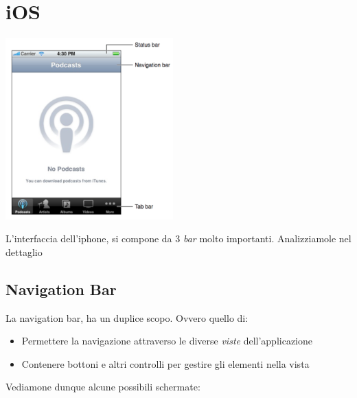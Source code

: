 \documentclass[oneside]{book}
\begin{document}
	\section{iOS}
		\begin{center}
		\includegraphics[height = 70mm]{images/varieBariPhone.png}
		\end{center}
		L'interfaccia dell'iphone, si compone da 3 \emph{bar} molto importanti. Analizziamole nel dettaglio	

		\subsection{Navigation Bar} \label{BarIOSApple}
			La navigation bar, ha un duplice scopo. Ovvero quello di:
			\begin{itemize}
			\item Permettere la navigazione attraverso le diverse \emph{viste} dell'applicazione			
			\item Contenere bottoni e altri controlli per gestire gli elementi nella vista
			\end{itemize}
			Vediamone dunque alcune possibili schermate:
			\begin{figure}[htbp]
				\centering%
			\end{figure}
\end{document}
